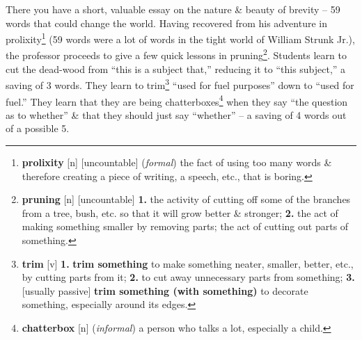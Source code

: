 \documentclass[oneside]{book}
\numberwithin{equation}{section}
\begin{document}
There you have a short, valuable essay on the nature \& beauty of brevity -- 59 words that could change the world. Having recovered from his adventure in prolixity\footnote{\textbf{prolixity} [n] [uncountable] (\textit{formal}) the fact of using too many words \& therefore creating a piece of writing, a speech, etc., that is boring.} (59 words were a lot of words in the tight world of William Strunk Jr.), the professor proceeds to give a few quick lessons in pruning\footnote{\textbf{pruning} [n] [uncountable] \textbf{1.} the activity of cutting off some of the branches from a tree, bush, etc. so that it will grow better \& stronger; \textbf{2.} the act of making something smaller by removing parts; the act of cutting out parts of something.}. Students learn to cut the dead-wood from ``this is a subject that,'' reducing it to ``this subject,'' a saving of 3 words. They learn to trim\footnote{\textbf{trim} [v] \textbf{1.} \textbf{trim something} to make something neater, smaller, better, etc., by cutting parts from it; \textbf{2.} to cut away unnecessary parts from something; \textbf{3.} [usually passive] \textbf{trim something (with something)} to decorate something, especially around its edges.} ``used for fuel purposes'' down to ``used for fuel.'' They learn that they are being chatterboxes\footnote{\textbf{chatterbox} [n] (\textit{informal}) a person who talks a lot, especially a child.} when they say ``the question as to whether'' \& that they should just say ``whether'' -- a saving of 4 words out of a possible 5.
\end{document}
